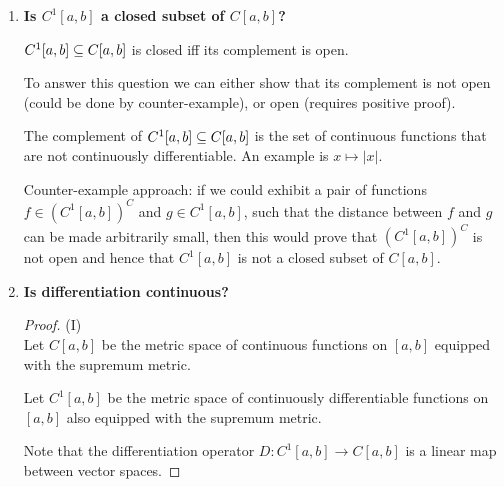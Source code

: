 \documentclass[12pt]{article}
\begin{document}
\begin{enumerate}[label=\roman*)]
\item \textbf{Is $C^1[a,b]$ a closed subset of $C[a,b]$?}

  $C^1[a,b] \subseteq C[a, b]$ is closed iff its complement is open.

  To answer this question we can either show that its complement is not open (could be done by
  counter-example), or open (requires positive proof).

  The complement of $C^1[a,b] \subseteq C[a, b]$ is the set of continuous functions that are not
  continuously differentiable. An example is $x \mapsto |x|$.

  Counter-example approach: if we could exhibit a pair of functions $f \in (C^1[a,b])^C$ and
  $g \in C^1[a,b]$, such that the distance between $f$ and $g$ can be made arbitrarily small, then
  this would prove that $(C^1[a,b])^C$ is not open and hence that $C^1[a,b]$ is not a closed subset
  of $C[a,b]$.



\newpage
\item \textbf{Is differentiation continuous?}\\

  \begin{proof} (I)~\\
    Let $C[a,b]$ be the metric space of continuous functions on $[a,b]$ equipped with the supremum
    metric.

    Let $C^1[a,b]$ be the metric space of continuously differentiable functions on $[a,b]$ also
    equipped with the supremum metric.

    Note that the differentiation operator $D:C^1[a,b] \to C[a,b]$ is a linear map between vector
    spaces.


\end{proof}
\end{enumerate}
\end{document}
